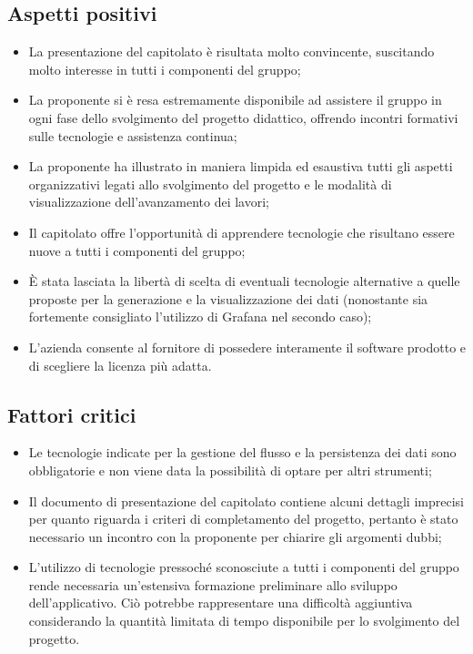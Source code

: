\subsection{Aspetti positivi}
\begin{itemize}
    \setlength\itemsep{0em}
    \item La presentazione del capitolato è risultata molto convincente, suscitando molto interesse in tutti i componenti del gruppo;
    \item La proponente si è resa estremamente disponibile ad assistere il gruppo in ogni fase dello svolgimento del progetto didattico, offrendo incontri formativi sulle tecnologie e assistenza continua;
    \item La proponente ha illustrato in maniera limpida ed esaustiva tutti gli aspetti organizzativi legati allo svolgimento del progetto e le modalità di visualizzazione dell'avanzamento dei lavori;
    \item Il capitolato offre l'opportunità di apprendere tecnologie che risultano essere nuove a tutti i componenti del gruppo;
    \item È stata lasciata la libertà di scelta di eventuali tecnologie alternative a quelle proposte per la generazione e la visualizzazione dei dati (nonostante sia fortemente consigliato l'utilizzo di Grafana nel secondo caso);
    \item L'azienda consente al fornitore di possedere interamente il software prodotto e di scegliere la licenza più adatta.
\end{itemize}

\subsection{Fattori critici}
\begin{itemize}
    \setlength\itemsep{0em}
    \item Le tecnologie indicate per la gestione del flusso e la persistenza dei dati sono obbligatorie e non viene data la possibilità di optare per altri strumenti;
    \item Il documento di presentazione del capitolato contiene alcuni dettagli imprecisi per quanto riguarda i criteri di completamento del progetto, pertanto è stato necessario un incontro con la proponente per chiarire gli argomenti dubbi;
    \item L'utilizzo di tecnologie pressoché sconosciute a tutti i componenti del gruppo rende necessaria un'estensiva formazione preliminare allo sviluppo dell'applicativo. Ciò potrebbe rappresentare una difficoltà aggiuntiva considerando la quantità limitata di tempo disponibile per lo svolgimento del progetto.
\end{itemize}

